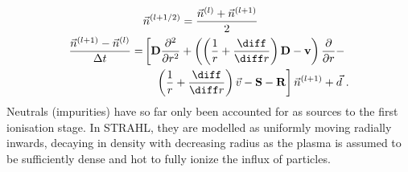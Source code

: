 %
            \begin{align}%
                \begin{split}%
                    &\vec{n}^{\left(l+1/2\right)}=\frac{\vec{n}^{\left(l\right)}+\vec{n}^{\left(l+1\right)}}{2}\,\,\\%
                    \frac{\vec{n}^{\left(l+1\right)}-\vec{n}^{\left(l\right)}}{\Delta t}=&\left[\mathbf{D}\frac{\partial^{2}}{\partial r^{2}}+\left(\left(\frac{1}{r}+\frac{\diff}{\diff r}\right)\mathbf{D}-\mathbf{v}\right)\frac{\partial}{\partial r}-\right.\\%
                    &\quad\left.\left(\frac{1}{r}+\frac{\diff}{\diff r}\right)\vec{v}-\mathbf{S}-\mathbf{R}\right]\vec{n}^{\left(l+1\right)}+\vec{d}\,\,.%
                \end{split}%
            \end{align}%
%
            Neutrals (impurities) have so far only been accounted for as sources to the first ionisation stage. In STRAHL, they are modelled as uniformly moving radially inwards, decaying in density with decreasing radius as the plasma is assumed to be sufficiently dense and hot to fully ionize the influx of particles.\\%

